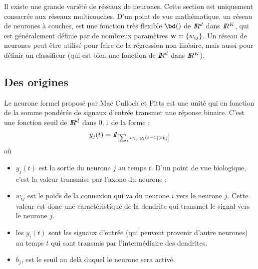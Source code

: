 Il existe une grande vari\'et\'e de r\'eseaux de neurones. Cette section est
uniquement consacr\'ee aux r\'eseaux multicouches. D'un point de vue math\'ematique, 
un r\'eseau de neurones \`a couches, est une fonction tr\`es flexible $\bd()$ de 
$I\!\!R^d$ dans $I\!\!R^K$, qui est g\'en\'eralement d\'efinie  par de nombreux  param\`etres 
$\mbox{\bf w}=\{w_{ij}\}$. Un r\'eseau de neurones peut  \^etre utilis\'e  pour faire de
la r\'egression non lin\'eaire, mais aussi pour d\'efinir un classifieur (qui est bien une 
fonction de $I\!\!R^d$ dans $I\!\!R^K$). 


\subsection{Des origines}
Le neurone formel propos\'e par  Mac Culloch et Pitts est  une unit\'e
qui en fonction de la somme pond\'er\'ee de  signaux d'entr\'ee transmet une
r\'eponse binaire. C'est une fonction seuil de $I\!\!R^d$ dans ${0,1}$ de la forme :
$$
y_j(t)=I\!\!I_{\left [ \sum_{i} w_{ij} \cdot y_i(t-1)>b_j \right ]}
$$
o\`u   
\begin{itemize}
\item $y_j(t)$ est la sortie du neurone $j$ au temps $t$. D'un 
point de vue biologique, c'est la valeur transmise par l'axone du neurone ; 
\item $w_{ij}$ est le poids de la connexion qui va du neurone $i$ vers le neurone $j$. 
Cette valeur est donc une caract\'eristique de la dendrite qui transmet le signal 
vers le neurone $j$.
\item les $y_i(t)$ sont les signaux d'entr\'ee (qui peuvent provenir d'autre neurones) au 
temps 
$t$ qui sont transmis par l'interm\'ediaire
des dendrites.
\item $b_j$, est le seuil au del\`a duquel le neurone sera activ\'e.
\end{itemize}

